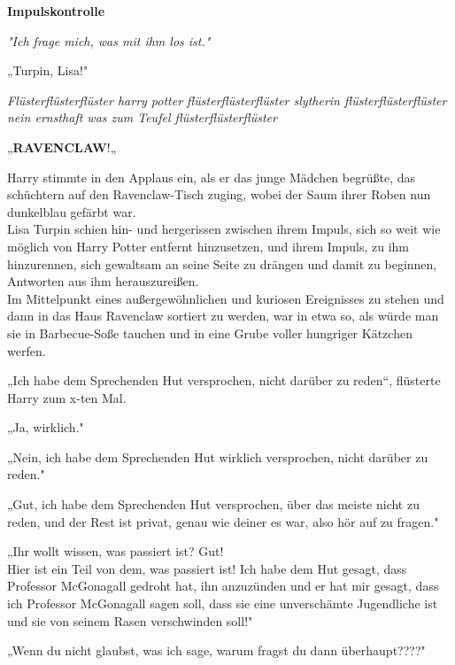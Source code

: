 

\hypertarget{impulskontrolle}{%

\textbf{Impulskontrolle}

\emph{"Ich frage mich, was mit ihm los ist."}

„Turpin, Lisa!"

\emph{Flüsterflüsterflüster harry potter flüsterflüsterflüster slytherin flüsterflüsterflüster nein ernsthaft was zum Teufel flüsterflüsterflüster}

„\textbf{RAVENCLAW}!„

Harry stimmte in den Applaus ein, als er das junge Mädchen begrüßte, das schüchtern auf den Ravenclaw-Tisch zuging, wobei der Saum ihrer Roben nun dunkelblau gefärbt war.\\ Lisa Turpin schien hin- und hergerissen zwischen ihrem Impuls, sich so weit wie möglich von Harry Potter entfernt hinzusetzen, und ihrem Impuls, zu ihm hinzurennen, sich gewaltsam an seine Seite zu drängen und damit zu beginnen, Antworten aus ihm herauszureißen.\\ Im Mittelpunkt eines außergewöhnlichen und kuriosen Ereignisses zu stehen und dann in das Haus Ravenclaw sortiert zu werden, war in etwa so, als würde man sie in Barbecue-Soße tauchen und in eine Grube voller hungriger Kätzchen werfen.

„Ich habe dem Sprechenden Hut versprochen, nicht darüber zu reden“, flüsterte Harry zum x-ten Mal.

„Ja, wirklich."

„Nein, ich habe dem Sprechenden Hut wirklich versprochen, nicht darüber zu reden."

„Gut, ich habe dem Sprechenden Hut versprochen, über das meiste nicht zu reden, und der Rest ist privat, genau wie deiner es war, also hör auf zu fragen."

„Ihr wollt wissen, was passiert ist? Gut!\\ Hier ist ein Teil von dem, was passiert ist! Ich habe dem Hut gesagt, dass Professor McGonagall gedroht hat, ihn anzuzünden und er hat mir gesagt, dass ich Professor McGonagall sagen soll, dass sie eine unverschämte Jugendliche ist und sie von seinem Rasen verschwinden soll!"

„Wenn du nicht glaubst, was ich sage, warum fragst du dann überhaupt????"

}
